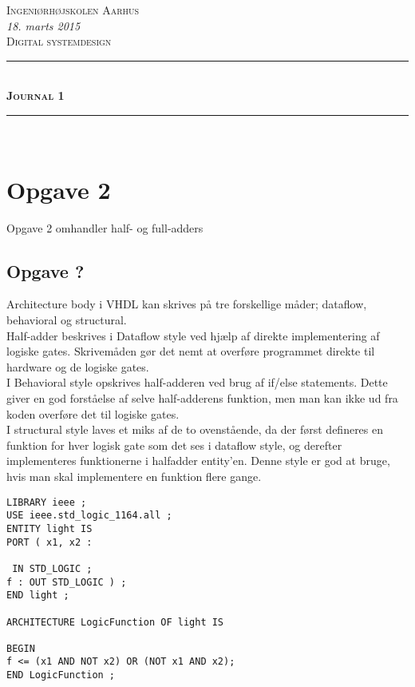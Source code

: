 \documentclass[a4paper,oneside,article]{article}
\begin{document}
	
\newcommand{\HRule}{\rule{\linewidth}{0.5mm}} %
	
\begin{center}
	

\textsc{\LARGE Ingeniørhøjskolen Aarhus}\\[1.5cm] %
\normalsize\emph{18. marts 2015}\\[1.0cm] 
\textsc{\large Digital systemdesign}\\[2.5cm] 
\HRule \\[0.4cm]
\huge \bfseries \textsc{Journal 1}\\[0.4cm]
\HRule \\[1.5cm]
\vspace{1 in}

\vspace{2 in}


\vfill %
\end{center} %
\section{Opgave 2}
Opgave 2 omhandler half- og full-adders\\

\subsection{Opgave ?}
Architecture body i VHDL kan skrives på tre forskellige måder; dataflow, behavioral og structural. \\
Half-adder beskrives i Dataflow style ved hjælp af direkte implementering af logiske gates. Skrivemåden gør det nemt at overføre programmet direkte til hardware og de logiske gates. \\
I Behavioral style opskrives half-adderen ved brug af if/else statements. Dette giver en god forståelse af selve half-adderens funktion, men man kan ikke ud fra koden overføre det til logiske gates. \\
I structural style laves et miks af de to ovenstående, da der først defineres en funktion for hver logisk gate som det ses i dataflow style, og derefter implementeres funktionerne i halfadder entity’en. Denne style er god at bruge, hvis man skal implementere en funktion flere gange.\\


\begin{lstlisting}
LIBRARY ieee ;
USE ieee.std_logic_1164.all ;
ENTITY light IS
PORT ( x1, x2 :

 IN STD_LOGIC ;
f : OUT STD_LOGIC ) ;
END light ;

ARCHITECTURE LogicFunction OF light IS

BEGIN
f <= (x1 AND NOT x2) OR (NOT x1 AND x2);
END LogicFunction ;
\end{lstlisting}
\end{document}
